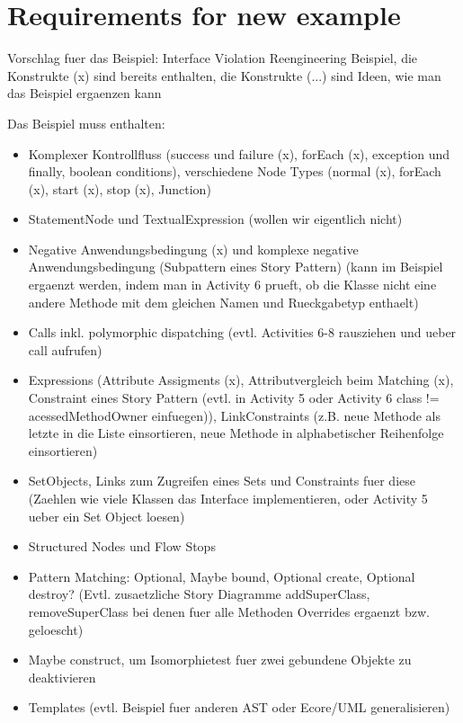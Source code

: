\section*{Requirements for new example}

Vorschlag fuer das Beispiel: Interface Violation Reengineering Beispiel, die Konstrukte (x) sind bereits enthalten, die Konstrukte (...) sind Ideen, wie man das Beispiel ergaenzen kann

Das Beispiel muss enthalten:
\begin{itemize}
  \item Komplexer Kontrollfluss (success und failure (x), forEach (x), exception und finally, boolean conditions), verschiedene Node Types (normal (x), forEach (x), start (x), stop (x), Junction)
  \item StatementNode und TextualExpression (wollen wir eigentlich nicht)
  \item Negative Anwendungsbedingung (x) und komplexe negative Anwendungsbedingung (Subpattern eines Story Pattern) (kann im Beispiel ergaenzt werden, indem man in Activity 6 prueft, ob die Klasse nicht eine andere Methode mit dem gleichen Namen und Rueckgabetyp enthaelt) 
  \item Calls inkl. polymorphic dispatching  (evtl. Activities 6-8 rausziehen und ueber call aufrufen)
  \item Expressions (Attribute Assigments (x), Attributvergleich beim Matching (x), Constraint eines Story Pattern (evtl. in Activity 5 oder Activity 6 class != acessedMethodOwner einfuegen)), LinkConstraints (z.B. neue Methode als letzte in die Liste einsortieren, neue Methode in alphabetischer Reihenfolge einsortieren)
  \item SetObjects, Links zum Zugreifen eines Sets und Constraints fuer diese (Zaehlen wie viele Klassen das Interface implementieren, oder Activity 5 ueber ein Set Object loesen)
  \item Structured Nodes und Flow Stops
  \item Pattern Matching: Optional, Maybe bound, Optional create, Optional destroy? (Evtl. zusaetzliche Story Diagramme addSuperClass, removeSuperClass bei denen fuer alle Methoden Overrides ergaenzt bzw. geloescht)
  \item Maybe construct, um Isomorphietest fuer zwei gebundene Objekte zu deaktivieren
  \item Templates (evtl. Beispiel fuer anderen AST oder Ecore/UML generalisieren)
\end{itemize}


